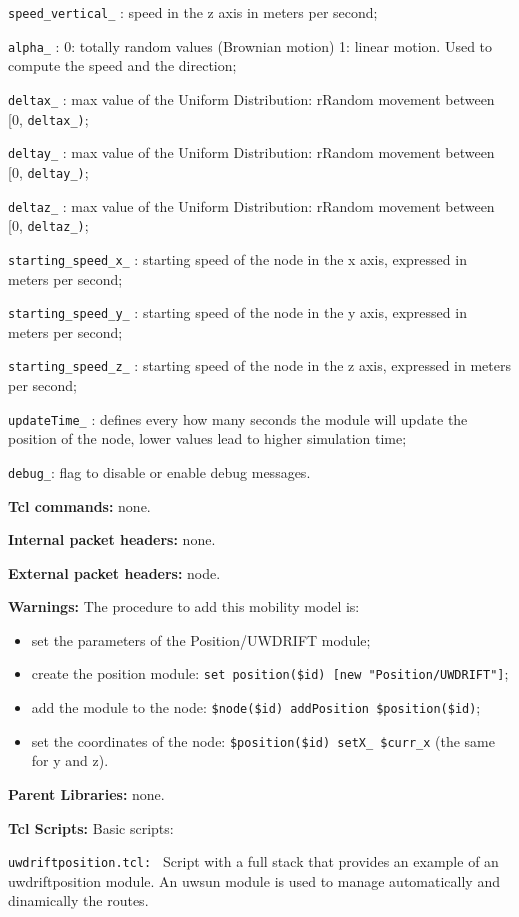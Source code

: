 \begin{description}
\begin{description}
    \item {\tt speed\_vertical\_} : speed in the z axis in meters per second;
    \item {\tt alpha\_} : 0: totally random values (Brownian motion) 1: linear motion. Used to compute the speed and the direction;
    \item {\tt deltax\_} : max value of the Uniform Distribution: rRandom movement between [0, {\tt deltax\_)};
    \item {\tt deltay\_} : max value of the Uniform Distribution: rRandom movement between [0, {\tt deltay\_)};
    \item {\tt deltaz\_} : max value of the Uniform Distribution: rRandom movement between [0, {\tt deltaz\_)};
    \item {\tt starting\_speed\_x\_} : starting speed of the node in the x axis, expressed in meters per second;
    \item {\tt starting\_speed\_y\_} : starting speed of the node in the y axis, expressed in meters per second;
    \item {\tt starting\_speed\_z\_} : starting speed of the node in the z axis, expressed in meters per second;
    \item {\tt updateTime\_} : defines every how many seconds the module will update the position of the node, lower values lead to higher simulation time;
    \item {\tt debug\_}: flag to disable or enable debug messages.
   \end{description}
   \item {\bf Tcl commands:} none.
   \item {\bf Internal packet headers:} none.
   \item {\bf External packet headers:} node.
   \item {\bf Warnings:} The procedure to add this mobility model is:
   \begin{itemize}
    \item set the parameters of the Position/UWDRIFT module;
    \item create the position module: {\tt set position(\$id) [new "Position/UWDRIFT"]};
    \item add the module to the node: {\tt \$node(\$id) addPosition \$position(\$id)};
    \item set the coordinates of the node: {\tt \$position(\$id) setX\_ \$curr\_x} (the same for y and z).
   \end{itemize}
   \item {\bf Parent Libraries:} none.
   \item {\bf Tcl Scripts:} 
   Basic scripts:
   \begin{description}
   \item {\tt uwdriftposition.tcl: } Script with a full stack that provides an example of an uwdriftposition module. An uwsun module is used to manage automatically and dinamically the routes.
   \end{description}
\end{description}

